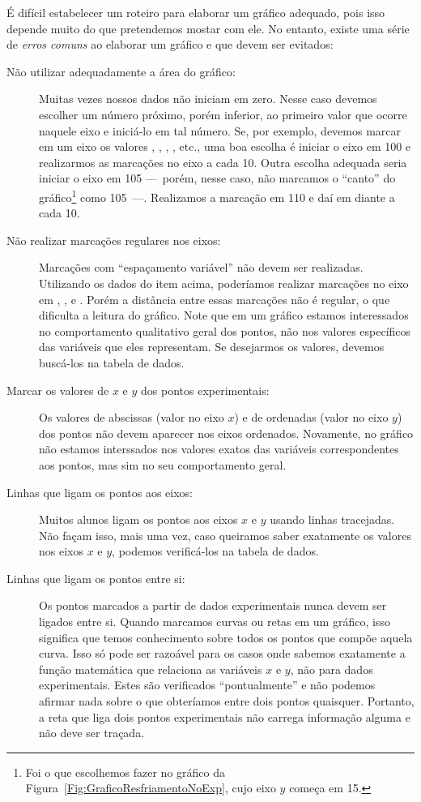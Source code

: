 É difícil estabelecer um roteiro para elaborar um gráfico adequado, pois isso depende muito do que pretendemos mostar com ele. No entanto, existe uma série de \emph{erros comuns} ao elaborar um gráfico e que devem ser evitados:
\begin{description}
	\item[Não utilizar adequadamente a área do gráfico:] Muitas vezes nossos dados não iniciam em zero. Nesse caso devemos escolher um número próximo, porém inferior, ao primeiro valor que ocorre naquele eixo e iniciá-lo em tal número. Se, por exemplo, devemos marcar em um eixo os valores , , , , etc., uma boa escolha é iniciar o eixo em 100 e realizarmos as marcações no eixo a cada 10. Outra escolha adequada seria iniciar o eixo em 105 ---~porém, nesse caso, não marcamos o ``canto'' do gráfico\footnote{Foi o que escolhemos fazer no gráfico da Figura~\ref{Fig:GraficoResfriamentoNoExp}, cujo eixo $y$ começa em 15.} como 105~---. Realizamos a marcação em 110 e daí em diante a cada 10.
	\item[Não realizar marcações regulares nos eixos:] Marcações com ``espaçamento variável'' não devem ser realizadas. Utilizando os dados do item acima, poderíamos realizar marcações no eixo em , ,  e . Porém a distância entre essas marcações não é regular, o que dificulta a leitura do gráfico. Note que em um gráfico estamos interessados no comportamento qualitativo geral dos pontos, não nos valores específicos das variáveis que eles representam. Se desejarmos os valores, devemos buscá-los na tabela de dados.
	\item[Marcar os valores de $x$ e $y$ dos pontos experimentais:] Os valores de abscissas (valor no eixo $x$) e de ordenadas (valor no eixo $y$) dos pontos não devem aparecer nos eixos ordenados. Novamente, no gráfico não estamos interssados nos valores exatos das variáveis correspondentes aos pontos, mas sim no seu comportamento geral.
	\item[Linhas que ligam os pontos aos eixos:] Muitos alunos ligam os pontos aos eixos $x$ e $y$ usando linhas tracejadas. Não façam isso, mais uma vez, caso queiramos saber exatamente os valores nos eixos $x$ e $y$, podemos verificá-los na tabela de dados.
	\item[Linhas que ligam os pontos entre si:] Os pontos marcados a partir de dados experimentais nunca devem ser ligados entre si. Quando marcamos curvas ou retas em um gráfico, isso significa que temos conhecimento sobre todos os pontos que compõe aquela curva. Isso só pode ser razoável para os casos onde sabemos exatamente a função matemática que relaciona as variáveis $x$ e $y$, não para dados experimentais. Estes são verificados ``pontualmente'' e não podemos afirmar nada sobre o que obteríamos entre dois pontos quaisquer. Portanto, a reta que liga dois pontos experimentais não carrega informação alguma e não deve ser traçada.

\end{description}
